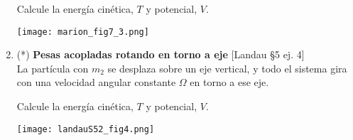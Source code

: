 \documentclass[11pt,spanish,a4paper]{article}
\begin{document}
\begin{enumerate}
\begin{minipage}[t][7cm]{0.5\textwidth}
Calcule la energía cinética, \(T\) y potencial, \(V\).
\end{minipage}
	\begin{minipage}[c][3cm][t]{0.5\textwidth}
	\texttt{[image: marion\_fig7\_3.png]}
\end{minipage}



\item \begin{minipage}[t][4.5cm]{0.65\textwidth}
(*) \textbf{Pesas acopladas rotando en torno a eje} [Landau \S5 ej. 4]\\
La partícula con \(m_2\) se desplaza sobre un eje vertical, y todo el sistema gira con una velocidad angular constante \(\Omega\) en torno a ese eje.

Calcule la energía cinética, \(T\) y potencial, \(V\).
\end{minipage}
	\begin{minipage}[c][5cm][t]{0.35\textwidth}
	\texttt{[image: landauS52\_fig4.png]}
\end{minipage}



\end{enumerate}
\end{document}
